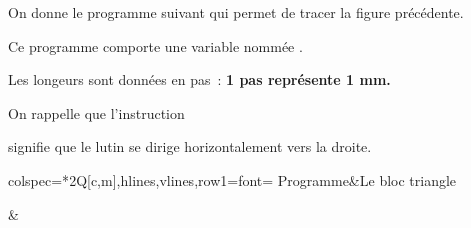 \documentclass[exercice,a4]{thedocument}%
\begin{document}
    \def\scratchscale{0.65}%
    \noindent
    \begin{minipage}{.4\linewidth}
        \noindent On donne le programme suivant qui permet de tracer la figure
        précédente.

        \noindent Ce programme comporte une variable nommée .

        \noindent Les longeurs sont données en pas~: \textbf{1 pas représente 1 mm.}

        \medskip\noindent On rappelle que l'instruction \begin{scratch}[scale=\scratchscale]
        \end{scratch}
        signifie que le lutin se dirige horizontalement vers la droite.
    \end{minipage}\hfill
    \begin{minipage}{.58\linewidth}
            \medskip\noindent
    \begin{tblr}{colspec=*{2}{Q[c,m]},hlines,vlines,row{1}={font=\small\bfseries}}
        Programme&Le bloc triangle\\
        \begin{scratch}[num blocks, scale=\scratchscale]
        \end{scratch}&
        \begin{scratch}[scale=\scratchscale]
        \end{scratch}
    \end{tblr}
    \end{minipage}
\end{document}

